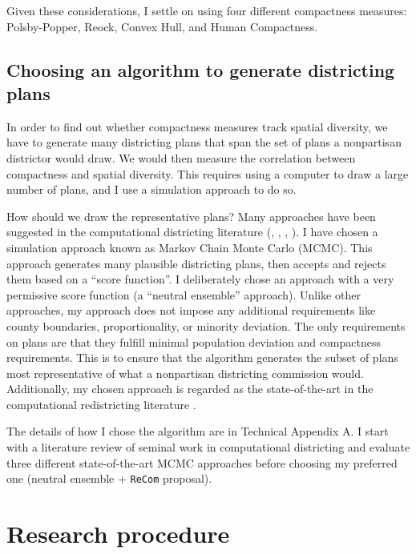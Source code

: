 \documentclass[]{article}
\begin{document}
Given these considerations, I settle on using four different compactness
measures: Polsby-Popper, Reock, Convex Hull, and Human Compactness.

\hypertarget{choosing-an-algorithm-to-generate-districting-plans}{%
\subsection{Choosing an algorithm to generate districting
plans}\label{choosing-an-algorithm-to-generate-districting-plans}}

In order to find out whether compactness measures track spatial
diversity, we have to generate many districting plans that span the set
of plans a nonpartisan districtor would draw. We would then measure the
correlation between compactness and spatial diversity. This requires
using a computer to draw a large number of plans, and I use a simulation
approach to do so.

How should we draw the representative plans? Many approaches have been
suggested in the computational districting literature (\cite{ccd2000},
\cite{cr2013}, \cite{fifieldwp}, \cite{ddj2019recom}). I have chosen a
simulation approach known as Markov Chain Monte Carlo (MCMC). This
approach generates many plausible districting plans, then accepts and
rejects them based on a ``score function''. I deliberately chose an
approach with a very permissive score function (a ``neutral ensemble''
approach). Unlike other approaches, my approach does not impose any
additional requirements like county boundaries, proportionality, or
minority deviation. The only requirements on plans are that they fulfill
minimal population deviation and compactness requirements. This is to
ensure that the algorithm generates the subset of plans most
representative of what a nonpartisan districting commission would.
Additionally, my chosen approach is regarded as the state-of-the-art in
the computational redistricting literature \citep{ddj2019recom}.

The details of how I chose the algorithm are in Technical Appendix A. I
start with a literature review of seminal work in computational
districting and evaluate three different state-of-the-art MCMC
approaches before choosing my preferred one (neutral ensemble +
\texttt{ReCom} proposal).

\hypertarget{research-procedure}{%
\section{Research procedure}\label{research-procedure}}
\end{document}
